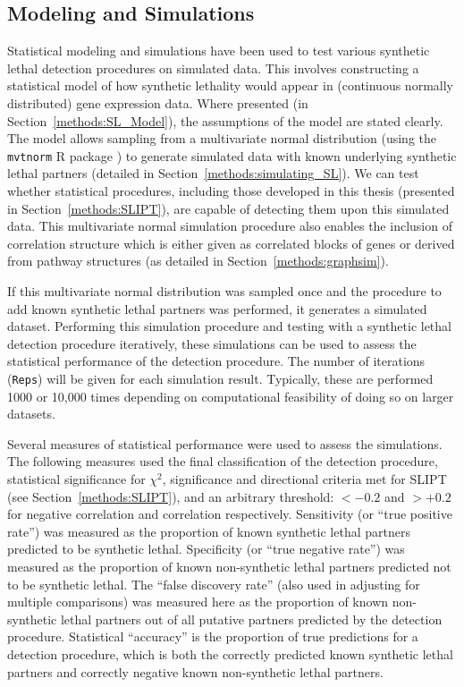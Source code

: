 \subsection{Modeling and Simulations} \label{methods:simulation}
Statistical modeling and simulations have been used to test various synthetic lethal detection procedures on simulated data. This involves constructing a statistical model of how synthetic lethality would appear in (continuous normally distributed) gene expression data. Where presented (in Section~\ref{methods:SL_Model}), the assumptions of the model are stated clearly. The model allows sampling from a multivariate normal distribution (using the \texttt{mvtnorm} R package \citep{Genz2009, mvtnorm}) to generate simulated data with known underlying synthetic lethal partners (detailed in Section~\ref{methods:simulating_SL}). We can test whether statistical procedures, including those developed in this thesis (presented in Section~\ref{methods:SLIPT}), are capable of detecting them upon this simulated data. This multivariate normal simulation procedure also enables the inclusion of correlation structure which is either given as correlated blocks of genes or derived from pathway structures (as detailed in Section~\ref{methods:graphsim}).

If this multivariate normal distribution was sampled once and the procedure to add known synthetic lethal partners was performed, it generates a simulated dataset. Performing this simulation procedure and testing with a synthetic lethal detection procedure iteratively, these simulations can be used to assess the statistical performance of the detection procedure. The number of iterations (\texttt{Reps}) will be given for each simulation result. Typically, these are performed 1000 or 10,000 times depending on computational feasibility of doing so on larger datasets. 

Several measures of statistical performance were used to assess the simulations. The following measures used the final classification of the detection procedure, statistical significance for $\chi^2$, significance and directional criteria met for \gls{SLIPT} (see Section~\ref{methods:SLIPT}), and an arbitrary threshold: $<-0.2$ and $>+0.2$ for  negative correlation and correlation respectively. Sensitivity (or ``true positive rate'') was measured as the proportion of known synthetic lethal partners predicted to be synthetic lethal. Specificity (or ``true negative rate'') was measured as the proportion of known non-synthetic lethal partners predicted not to be synthetic lethal. The ``false discovery rate'' (also used in adjusting for multiple comparisons) was measured here as the proportion of known non-synthetic lethal partners out of all putative partners predicted by the detection procedure. Statistical ``accuracy'' is the proportion of true predictions for a detection procedure, which is both the correctly predicted known synthetic lethal partners and correctly negative known non-synthetic lethal partners.

